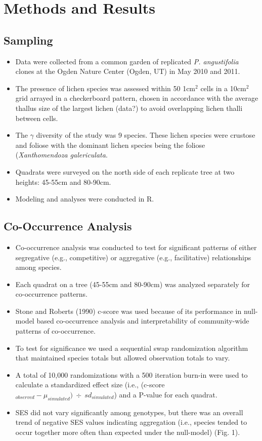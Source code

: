 \documentclass[11pt]{article}
\begin{document}
\section{Methods and Results}

\subsection{Sampling}
\begin{itemize}
\item Data were collected from a common garden of replicated \textit{P. angustifolia} clones at the Ogden Nature Center (Ogden, UT) in May 2010 and 2011.
\item The presence of lichen species was assessed within 50 1cm$^2$ cells in a 10cm$^2$ grid arrayed in a checkerboard pattern, chosen in accordance with the average thallus size of the largest lichen 
(data?) to avoid overlapping lichen thalli between cells.
\item The $\gamma$ diversity of the study was 9 species. These lichen species were crustose and foliose with the dominant lichen species being the foliose (\textit{Xanthomendoza galericulata}.
\item Quadrats were surveyed on the north side of each replicate tree at two heights: 45-55cm and 80-90cm.
\item Modeling and analyses were conducted in R. 
\end{itemize}

\subsection{Co-Occurrence Analysis}

\begin{itemize}
\item Co-occurrence analysis was conducted to test for significant patterns of either segregative (e.g., competitive) or aggregative (e.g., facilitative) relationships among species.
\item Each quadrat on a tree (45-55cm and 80-90cm) was analyzed separately for co-occurrence patterns.
\item Stone and Roberts (1990) c-score was used because of its performance in null-model based co-occurrence analysis and interpretability of community-wide patterns of co-occurrence.
\item To test for significance we used a sequential swap randomization algorithm that maintained species totals but allowed observation totals to vary.
\item A total of 10,000 randomizations with a 500 iteration burn-in were used to calculate a standardized effect size (i.e., (c-score$_{observed} - \mu_{simulated}) \ \div \ sd_{simulated}$) and a P-value for each quadrat.
\item SES did not vary significantly among genotypes, but there was an overall trend of negative SES values indicating aggregation (i.e., species tended to occur together more often than expected under the null-model) (Fig. 1).
\end{itemize}
\end{document}
